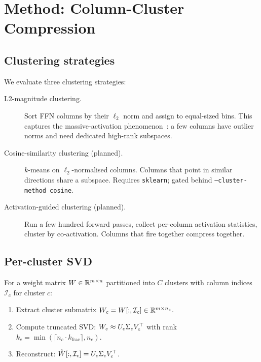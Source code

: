 \documentclass[11pt]{article}
\begin{document}
\section{Method: Column-Cluster Compression}
\label{sec:method}

\subsection{Clustering strategies}

We evaluate three clustering strategies:

\begin{description}
\item[L2-magnitude clustering.]  Sort FFN columns by their $\ell_2$ norm
      and assign to equal-sized bins.  This captures the massive-activation
      phenomenon~\cite{sun2024massive}: a few columns have outlier norms
      and need dedicated high-rank subspaces.

\item[Cosine-similarity clustering (planned).]  $k$-means on $\ell_2$-normalised
      columns.  Columns that point in similar directions share a subspace.
      Requires \texttt{sklearn}; gated behind \texttt{--cluster-method cosine}.

\item[Activation-guided clustering (planned).]  Run a few hundred forward
      passes, collect per-column activation statistics, cluster by
      co-activation.  Columns that fire together compress together.
\end{description}

\subsection{Per-cluster SVD}

For a weight matrix $W\in\mathbb{R}^{m\times n}$ partitioned into $C$ clusters
with column indices $\mathcal{I}_c$ for cluster $c$:

\begin{enumerate}
\item Extract cluster submatrix $W_c = W[:,\mathcal{I}_c]\in\mathbb{R}^{m\times n_c}$.
\item Compute truncated SVD: $W_c \approx U_c\Sigma_cV_c^\top$
      with rank $k_c = \min(\lceil n_c\cdot k_\text{frac}\rceil, n_c)$.
\item Reconstruct: $\hat{W}[:,\mathcal{I}_c] = U_c\Sigma_cV_c^\top$.
\end{enumerate}
\end{document}

